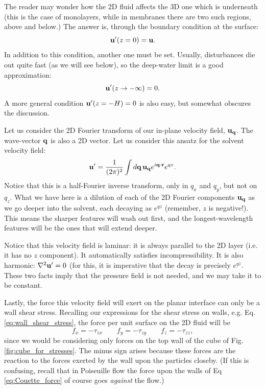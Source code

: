 The reader may wonder how the 2D fluid affects the 3D one which is
underneath (this is the case of monolayers, while in membranes there
are two such regions, above and below.) The answer is, through the
boundary condition at the surface:
\[
  \mathbf{u}'(z=0) = \mathbf{u} .
\]
In addition to this condition, another one must be set. Usually,
disturbances die out quite fast (as we will see below), so the
deep-water limit is a good approximation:
\[
  \mathbf{u}'(z \to -\infty ) = 0 .
\]
A more general condition $\mathbf{u}'(z = -H ) = 0$ is also easy, but
somewhat obscures the discussion.

Let us consider the 2D Fourier transform of our in-plane velocity
field, $\mathbf{u}_{\mathbf{q}}$. The wave-vector $\mathbf{q}$ is also a 2D vector. Let us
consider this ansatz for the solvent velocity field:
\[
  \mathbf{u}' =  \frac 1{(2\pi)^2}  \int d\mathbf{q} \, \mathbf{u}_{\mathbf{q}} e^{ i\mathbf{q}\cdot\mathbf{r}} e^{q z} .
\]
Notice that this is a half-Fourier inverse transform, only in $q_x$
and $q_y$, but not on $q_z$. What we have here is a dilution of each
of the 2D Fourier components $\mathbf{u}_{\mathbf{q}}$ as we go deeper into the
solvent, each decaying as $e^{q z} $ (remember, $z$ is
negative!). This means the sharper features will wash out first, and
the longest-wavelength features will be the ones that will extend
deeper.

Notice that this velocity field is laminar: it is always parallel to
the 2D layer (i.e. it has no $z$ component). It automatically
satisfies incompressibility. It is also harmonic: $\nabla^2 \mathbf{u}' = 0$
(for this, it is imperative that the decay is precisely
$e^{qz}$. These two facts imply that the pressure field is not needed,
and we may take it to be constant.

Lastly, the force this velocity field will exert on the planar
interface can only be a wall shear stress. Recalling our expressions
for the shear stress on walls, e.g. Eq.  \ref{eq:wall_shear_stress},
the force per unit surface on the 2D fluid will be
\begin{equation*}
  f_x = - \tau_{zx} \qquad
  f_y = - \tau_{zy} \qquad
  f_z = - \tau_{zz} ,
\end{equation*}
since we would be considering only forces on the top wall of the cube
of Fig. \ref{fig:cube_for_stresses}. The minus sign arises because
these forces are the reaction to the forces exerted by the wall upon
the particles closeby. (If this is confusing, recall that in
Poiseuille flow the force upon the walls of Eq \ref{eq:Couette_force}
of course goes \emph{against} the flow.)

